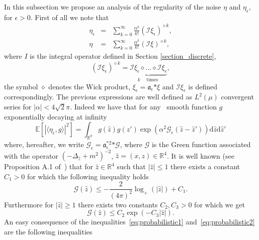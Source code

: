 \documentclass[a4paper,10pt]{article}
\newcommand{\asterisk}{\mathord{*}}
\newcommand{\mathd}{\mathrm{d}}
\newcommand{\tmop}[1]{\ensuremath{\operatorname{#1}}}
\begin{document}
In this subsection we propose an analysis of the regularity of the noise
$\eta$ and $\eta_{\epsilon}$, for $\epsilon > 0$. First of all we note that
\begin{eqnarray}
  \eta_{\epsilon} & = & \sum_{k = 0}^{\infty} \frac{\alpha^k}{k!} (\mathcal{I}
  \xi_{\epsilon})^{\diamond k},  \label{eq:noise1}\\
  \eta & = & \sum_{k = 0}^{\infty} \frac{\alpha^k}{k!} (\mathcal{I}
  \xi)^{\diamond k},  \label{eq:noise2}
\end{eqnarray}
where $I$ is the integral operator defined in Section \ref{section_discrete},
\[ (\mathcal{I} \xi_{\epsilon})^{\diamond k} = \underbrace{\mathcal{I}
   \xi_{\epsilon} \diamond \ldots \diamond \mathcal{I} \xi_{\epsilon}}_{k
   \quad \tmop{times}} , \]
the symbol $\diamond$ denotes the Wick product, $\xi_{\epsilon} =
\mathfrak{a}_{\epsilon} \asterisk \xi$ and $\mathcal{I} \xi_{\epsilon}$ is
defined correspondingly. The previous expressions are well defined as $L^2
(\mu)$ convergent series for $| \alpha | < 4 \sqrt{2} \pi$. Indeed we have
that for any \ smooth function $g$ exponentially decaying at infinity \
\begin{equation}
  \mathbb{E} [| \langle \eta_{\epsilon}, g \rangle |^2] = \int_{\mathbb{R}^8}
  g (\hat{z}) g (\hat{z}') \exp (\alpha^2 \mathcal{G}_{\epsilon} (\hat{z} -
  \hat{z}')) \mathd \hat{z} \mathd \hat{z}' \label{eq:noise3}
\end{equation}
where, hereafter, we write $\mathcal{G}_{\epsilon} = \mathfrak{a}^{\asterisk
2}_{\epsilon} \asterisk \mathcal{G}$, where $\mathcal{G}$ is the Green
function associated with the operator $(- \Delta_{\hat{z}} + m^2)^{- 2}$,
$\hat{z} = (x, z) \in \mathbb{R}^4$. It is well known (see Proposition A.1
of~{\cite{Albeverio2002}}) that for $\hat{z} \in \mathbb{R}^4$ such that $|
\hat{z} | \leqslant 1$ there exists a constant $C_1 > 0$ for which the
following inequality holds
\begin{equation}
  \mathcal{G} (\hat{z}) \leqslant - \frac{2}{(4 \pi)^2} \log_+ (| \hat{z} |) +
  C_1 \label{eq:probabilistic1} .
\end{equation}
Furthermore for $| \hat{z} | \geqslant 1$ there exists two constants $C_2, C_3
> 0$ for which we get
\begin{equation}
  \mathcal{G} (\hat{z}) \leqslant C_2 \exp (- C_3 | \hat{z} |)
  \label{eq:probabilistic2} .
\end{equation}
An easy consequence of the inequalities~{\eqref{eq:probabilistic1}}
and~{\eqref{eq:probabilistic2}} are the following inequalities
\end{document}
